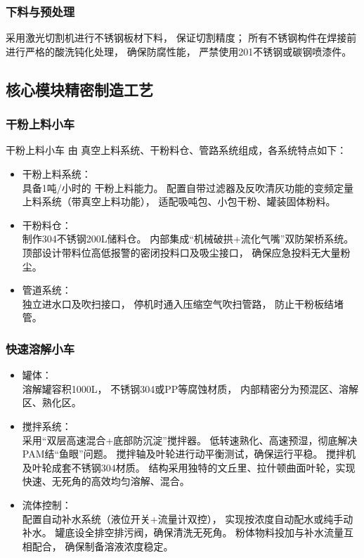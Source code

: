 \documentclass[UTF8,a4paper,12pt,titlepage]{ctexart}
\begin{document}
        \subsubsection{下料与预处理}
        采用激光切割机进行不锈钢板材下料，
        保证切割精度；
        所有不锈钢构件在焊接前进行严格的酸洗钝化处理，
        确保防腐性能，
        严禁使用201不锈钢或碳钢喷漆件。

    \subsection{核心模块精密制造工艺}
        \subsubsection{干粉上料小车}
        干粉上料小车 由 真空上料系统、干粉料仓、管路系统组成，各系统特点如下：
        \begin{itemize}
            \item 干粉上料系统：\\
                具备1吨/小时的 干粉上料能力。
                配置自带过滤器及反吹清灰功能的变频定量上料系统（带真空上料功能），
                适配吸吨包、小包干粉、罐装固体粉料。
            \item 干粉料仓：\\
                制作304不锈钢200L储料仓。
                内部集成“机械破拱+流化气嘴”双防架桥系统。
                顶部设计带料位高低报警的密闭投料口及吸尘接口，
                确保应急投料无大量粉尘。
            \item 管道系统：\\
                独立进水口及吹扫接口，
                停机时通入压缩空气吹扫管路，
                防止干粉板结堵管。
        \end{itemize}

        \subsubsection{快速溶解小车}
        \begin{itemize}
            \item 罐体：\\
                溶解罐容积1000L，
                不锈钢304或PP等腐蚀材质，
                内部精密分为预混区、溶解区、熟化区。
            \item 搅拌系统：\\
                采用“双层高速混合+底部防沉淀”搅拌器。
                低转速熟化、高速预湿，彻底解决PAM结“鱼眼”问题。
                搅拌轴及叶轮进行动平衡测试，确保运行平稳。
                搅拌机及叶轮成套不锈钢304材质。
                结构采用独特的文丘里、拉什顿曲面叶轮，实现快速、无死角的高效均匀溶解、混合。
                
            \item 流体控制：\\
                配置自动补水系统（液位开关+流量计双控），
                实现按浓度自动配水或纯手动补水。
                罐底设全排空排污阀，确保清洗无死角。
                粉体物料投加与补水流量互相配合，
                确保制备溶液浓度稳定。
        \end{itemize}
\end{document}
